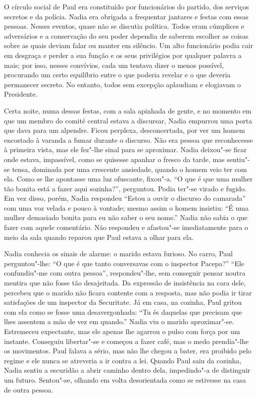 O círculo social de Paul era constituído por funcionários do partido, dos serviços secretos e da polícia. Nadia era obrigada
a frequentar jantares e festas com essas pessoas. Nesses eventos,
quase não se discutia política. Todos eram cúmplices e adversários e a
conservação do seu poder dependia de saberem escolher as coisas sobre as
quais deviam falar ou manter em silêncio. Um alto funcionário podia cair
em desgraça e perder a sua função e os seus privilégios por qualquer
palavra a mais; por isso, nesses convívios, cada um tentava dizer o
menos possível, procurando um certo equilíbrio entre o que poderia revelar e o que deveria
permanecer secreto. No entanto, todos sem excepção aplaudiam e elogiavam
o Presidente.

Certa noite, numa dessas festas, com a sala apinhada de gente, e no
momento em que um membro do comité central estava a discursar, Nadia
empurrou uma porta que dava para um alpendre. Ficou perplexa,
desconcertada, por ver um homem encostado à varanda a fumar durante o
discurso. Não era pessoa que reconhecesse à primeira vista, mas ele
fez"-lhe sinal para se aproximar. Nadia deixou"-se ficar onde estava,
impassível, como se quisesse apanhar o fresco da tarde, mas sentiu"-se
tensa, dominada por uma crescente ansiedade, quando o homem veio ter com
ela. Como se lhe apontasse uma luz ofuscante, fixou"-a.
``O que é que uma mulher tão bonita está a fazer aqui sozinha?'',
perguntou. Podia ter"-se virado e fugido. Em vez disso, porém, Nadia
respondeu ``Estou a ouvir o discurso do camarada'' com uma voz velada e
pouco à vontade; mesmo assim o homem insistiu: ``É uma mulher demasiado
bonita para eu não saber o seu nome.'' Nadia não sabia o que fazer com
aquele comentário. Não respondeu e afastou"-se imediatamente para o meio
da sala quando reparou que Paul estava a olhar para ela.

Nadia conhecia os sinais de alarme: o marido estava furioso. No carro,
Paul perguntou"-lhe: ``O que é que tanto conversavas com o inspector
Pacepa?'' ``Ele confundiu"-me com outra pessoa'', respondeu"-lhe, sem
conseguir pensar noutra mentira que não fosse tão desajeitada. Da
expressão de insistência na cara dele, percebeu que o marido não
ficara contente com a resposta, mas não podia ir tirar
satisfações de um inspector da Securitate. Já em casa, na cozinha, Paul
gritou com ela como se fosse uma desavergonhada: ``Tu és daquelas que
precisam que lhes assentem a mão de vez em quando.'' Nadia viu o marido
aproximar"-se. Estremeceu expectante, mas ele apenas lhe agarrou o pulso com força
por um instante. Conseguiu libertar"-se e começou a fazer café, mas o
medo prendia"-lhe os movimentos. Paul falava a sério, mas não lhe
chegou a bater, era proibido pelo regime e ele nunca se atreveria a ir
contra a lei. Quando Paul saiu da cozinha, Nadia sentiu a escuridão a
abrir caminho dentro dela, impedindo"-a de distinguir um futuro.
Sentou"-se, olhando em volta desorientada como se estivesse na casa de
outra pessoa.

